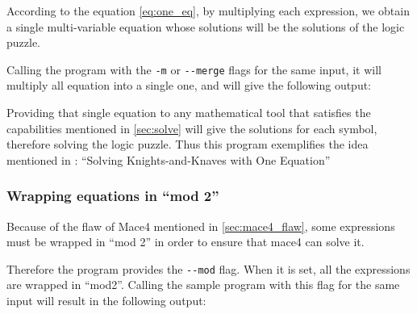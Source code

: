 According to the equation \ref{eq:one_eq}, by multiplying each expression, we obtain a single multi-variable equation whose solutions will be the solutions of the logic puzzle.

Calling the program with the \verb|-m| or \verb|--merge| flags for the same input, it will multiply all equation into a single one, and will give the following output:



Providing that single equation to any mathematical tool that satisfies the capabilities mentioned in \ref{sec:solve} will give the solutions for each symbol, therefore solving the logic puzzle. Thus this program exemplifies the idea mentioned in \cite{Ciraulo2020algebra}: ``Solving Knights-and-Knaves with One Equation''




\subsubsection{Wrapping equations in ``mod 2''}

Because of the flaw of Mace4 mentioned in \ref{sec:mace4_flaw}, some expressions must be wrapped in ``mod 2'' in order to ensure that mace4 can solve it.

Therefore the program provides the \verb|--mod| flag. When it is set, all the expressions are wrapped in ``mod2''. Calling the sample program with this flag for the same input will result in the following output:




